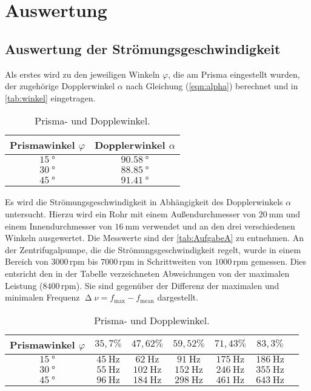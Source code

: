 \section{Auswertung}
\label{sec:Auswertung}

\subsection{Auswertung der Strömungsgeschwindigkeit}
\label{subsec:stroemi}
Als erstes wird zu den jeweiligen Winkeln $\varphi$, die am Prisma eingestellt wurden, der zugehörige Dopplerwinkel $\alpha$ nach Gleichung (\ref{eqn:alpha})
berechnet und in \autoref{tab:winkel} eingetragen.
\begin{table}[H]
  \centering
  \caption{Prisma- und Dopplewinkel.}
  \label{tab:winkel}
  \begin{tabular}{c c}
    \toprule
    Prismawinkel $\varphi$ & Dopplerwinkel $\alpha$ \\
    \midrule
    $\SI{15}{\degree}$ & $\SI{90,58}{\degree}$ \\
    $\SI{30}{\degree}$ & $\SI{88,85}{\degree}$ \\
    $\SI{45}{\degree}$ & $\SI{91,41}{\degree}$ \\
    \bottomrule
  \end{tabular}
\end{table}

\noindent
Es wird die Strömungsgeschwindigkeit in Abhängigkeit des Dopplerwinkels $\alpha$ untersucht. Hierzu wird ein Rohr mit einem Außendurchmesser von $\SI{20}{\milli\meter}$
und einem Innendurchmesser von $\SI{16}{\milli\meter}$ verwendet und an den drei verschiedenen Winkeln ausgewertet. Die Messwerte sind der \autoref{tab:AufgabeA} zu entnehmen.
An der Zentrifugalpumpe, die die Strömungsgeschwindigkeit regelt, wurde in einem Bereich von $3000 \,\text{rpm}$ bis $7000 \,\text{rpm}$ in Schrittweiten von $1000 \,\text{rpm}$ gemessen. Dies entsricht den in der
Tabelle verzeichneten Abweichungen von der maximalen Leistung ($8400\, \text{rpm}$). Sie sind gegenüber der Differenz der maximalen und minimalen Frequenz $\upDelta \nu = f_{\text{max}} - f_{\text{mean}}$ dargestellt.
\begin{table}[H]
  \centering
  \caption{Prisma- und Dopplewinkel.}
  \label{tab:AufgabeA}
  \begin{tabular}{c c c c c c c}
    \toprule
    Prismawinkel $\varphi$ & $35,7 \%$ & $47,62 \%$ & $59,52 \%$ & $71,43 \%$ & $83,3 \%$\\
    \midrule
    $\SI{15}{\degree}$ & $\SI{45}{\hertz}$ & $\SI{62}{\hertz}$ & $\SI{91}{\hertz}$ & $\SI{175}{\hertz}$ & $\SI{186}{\hertz}$ \\
    $\SI{30}{\degree}$ & $\SI{55}{\hertz}$ & $\SI{102}{\hertz}$ & $\SI{152}{\hertz}$ & $\SI{246}{\hertz}$ & $\SI{355}{\hertz}$ \\
    $\SI{45}{\degree}$ & $\SI{96}{\hertz}$ & $\SI{184}{\hertz}$ & $\SI{298}{\hertz}$ & $\SI{461}{\hertz}$ & $\SI{643}{\hertz}$ \\
    \bottomrule
  \end{tabular}
\end{table}

